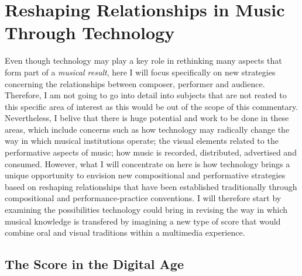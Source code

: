 \section{Reshaping Relationships in Music Through Technology}

Even though technology may play a key role in rethinking many aspects that form part of a \emph{musical result}, here I will focus specifically on new strategies concerning the relationships between composer, performer and audience. Therefore, I am not going to go into detail into subjects that are not reated to this specific area of interest as this would be out of the scope of this commentary. Nevertheless, I belive that there is huge potential and work to be done in these areas, which include concerns such as how technology may radically change the way in which musical institutions operate; the visual elements related to the performative aspects of music; how music is recorded, distributed, advertised and consumed. However, what I will concentrate on here is how technology brings a unique opportunity to envision new compositional and performative strategies based on reshaping relationships that have been established traditionally through compositional and performance-practice conventions. I will therefore start by examining the possibilities technology could bring in revising the way in which musical knowledge is transfered by imagining a new type of score that would combine oral and visual traditions within a multimedia experience.

\subsection{The Score in the Digital Age}

